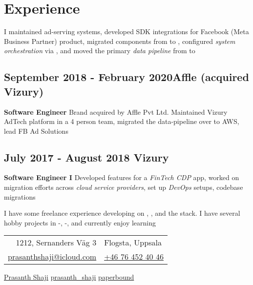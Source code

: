\documentclass{scrartcl}
\begin{document}
	\section{Experience}

	I maintained ad-serving systems, developed SDK integrations for Facebook (Meta Business Partner) product, migrated components from  to , configured \textit{system orchestration} via 
	, and moved the primary \textit{data pipeline} from  to 

		\subsection[Affle]{September 2018 - February 2020\hfill Affle (acquired Vizury)}
		\textbf{Software Engineer}
		Brand acquired by Affle Pvt Ltd. Maintained Vizury AdTech platform in a 4 person team, migrated the  data-pipeline over to AWS, lead FB Ad Solutions

		\subsection[Vizury]{July 2017 - August 2018 \hfill Vizury}
		\textbf{Software Engineer I}
		Developed features for a \textit{FinTech CDP} app, worked on migration efforts across \textit{cloud service providers}, set up \textit{DevOps } setups, codebase migrations \newline

	I have some freelance experience developing on , , and the  stack. I have several hobby projects in -, -, and currently enjoy learning 

	\vfill

	\begin{center}
		\begin{tabular}{rl}
			1212, Sernanders Väg 3 & Flogsta, Uppsala \\
			\href{mailto:prasanthshaji@icloud.com}{prasanthshaji@icloud.com} & \href{tel:+46764524046}{+46 76 452 40 46}
		\end{tabular}
	\end{center}

	\begin{center}
		{\color{blue}}
		\href{https://www.linkedin.com/in/prasanth-thomas-shaji/}{Prasanth Shaji}
		{\color{cyan}}
		\href{https://twitter.com/prasanth_shaji}{prasanth\_shaji}
		{\color{black}}
		\href{https://github.com/paperbound}{paperbound}
	\end{center}
\end{document}
